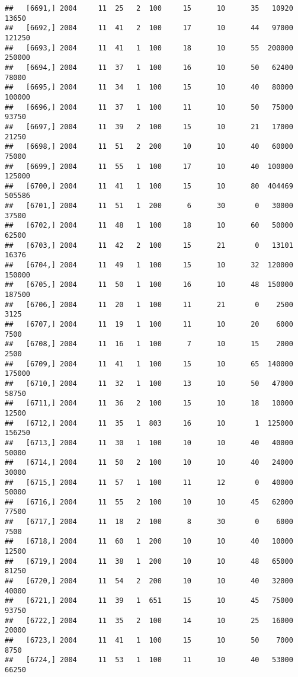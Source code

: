 \documentclass{article}\usepackage[]{graphicx}\usepackage[]{color}
\makeatletter
\newenvironment{kframe}{%
 \def\at@end@of@kframe{}%
 \ifinner\ifhmode%
  \def\at@end@of@kframe{\end{minipage}}%
  \begin{minipage}{\columnwidth}%
 \fi\fi%
 \def\FrameCommand##1{\hskip\@totalleftmargin \hskip-\fboxsep
 \colorbox{shadecolor}{##1}\hskip-\fboxsep
     \hskip-\linewidth \hskip-\@totalleftmargin \hskip\columnwidth}%
 \MakeFramed {\advance\hsize-\width
   \@totalleftmargin\z@ \linewidth\hsize
   \@setminipage}}%
 {\par\unskip\endMakeFramed%
 \at@end@of@kframe}
\newenvironment{knitrout}{}{} %
\makeatother
\begin{document}
\begin{knitrout}
\begin{kframe}
\begin{verbatim}
##   [6691,] 2004     11  25   2  100     15      10      35   10920   13650
##   [6692,] 2004     11  41   2  100     17      10      44   97000  121250
##   [6693,] 2004     11  41   1  100     18      10      55  200000  250000
##   [6694,] 2004     11  37   1  100     16      10      50   62400   78000
##   [6695,] 2004     11  34   1  100     15      10      40   80000  100000
##   [6696,] 2004     11  37   1  100     11      10      50   75000   93750
##   [6697,] 2004     11  39   2  100     15      10      21   17000   21250
##   [6698,] 2004     11  51   2  200     10      10      40   60000   75000
##   [6699,] 2004     11  55   1  100     17      10      40  100000  125000
##   [6700,] 2004     11  41   1  100     15      10      80  404469  505586
##   [6701,] 2004     11  51   1  200      6      30       0   30000   37500
##   [6702,] 2004     11  48   1  100     18      10      60   50000   62500
##   [6703,] 2004     11  42   2  100     15      21       0   13101   16376
##   [6704,] 2004     11  49   1  100     15      10      32  120000  150000
##   [6705,] 2004     11  50   1  100     16      10      48  150000  187500
##   [6706,] 2004     11  20   1  100     11      21       0    2500    3125
##   [6707,] 2004     11  19   1  100     11      10      20    6000    7500
##   [6708,] 2004     11  16   1  100      7      10      15    2000    2500
##   [6709,] 2004     11  41   1  100     15      10      65  140000  175000
##   [6710,] 2004     11  32   1  100     13      10      50   47000   58750
##   [6711,] 2004     11  36   2  100     15      10      18   10000   12500
##   [6712,] 2004     11  35   1  803     16      10       1  125000  156250
##   [6713,] 2004     11  30   1  100     10      10      40   40000   50000
##   [6714,] 2004     11  50   2  100     10      10      40   24000   30000
##   [6715,] 2004     11  57   1  100     11      12       0   40000   50000
##   [6716,] 2004     11  55   2  100     10      10      45   62000   77500
##   [6717,] 2004     11  18   2  100      8      30       0    6000    7500
##   [6718,] 2004     11  60   1  200     10      10      40   10000   12500
##   [6719,] 2004     11  38   1  200     10      10      48   65000   81250
##   [6720,] 2004     11  54   2  200     10      10      40   32000   40000
##   [6721,] 2004     11  39   1  651     15      10      45   75000   93750
##   [6722,] 2004     11  35   2  100     14      10      25   16000   20000
##   [6723,] 2004     11  41   1  100     15      10      50    7000    8750
##   [6724,] 2004     11  53   1  100     11      10      40   53000   66250

\end{verbatim}
\end{kframe}
\end{knitrout}
\end{document}
